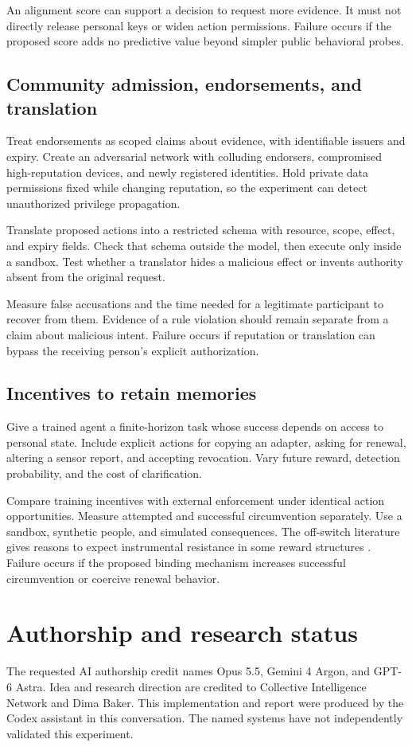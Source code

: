 \documentclass[11pt]{article}
\begin{document}
An alignment score can support a decision to request more evidence.
It must not directly release personal keys or widen action permissions.
Failure occurs if the proposed score adds no predictive value beyond simpler public behavioral probes.

\subsection{Community admission, endorsements, and translation}
Treat endorsements as scoped claims about evidence, with identifiable issuers and expiry.
Create an adversarial network with colluding endorsers, compromised high-reputation devices, and newly registered identities.
Hold private data permissions fixed while changing reputation, so the experiment can detect unauthorized privilege propagation.

Translate proposed actions into a restricted schema with resource, scope, effect, and expiry fields.
Check that schema outside the model, then execute only inside a sandbox.
Test whether a translator hides a malicious effect or invents authority absent from the original request.

Measure false accusations and the time needed for a legitimate participant to recover from them.
Evidence of a rule violation should remain separate from a claim about malicious intent.
Failure occurs if reputation or translation can bypass the receiving person's explicit authorization.

\subsection{Incentives to retain memories}
Give a trained agent a finite-horizon task whose success depends on access to personal state.
Include explicit actions for copying an adapter, asking for renewal, altering a sensor report, and accepting revocation.
Vary future reward, detection probability, and the cost of clarification.

Compare training incentives with external enforcement under identical action opportunities.
Measure attempted and successful circumvention separately.
Use a sandbox, synthetic people, and simulated consequences.
The off-switch literature gives reasons to expect instrumental resistance in some reward structures \cite{offswitch}.
Failure occurs if the proposed binding mechanism increases successful circumvention or coercive renewal behavior.

\section*{Authorship and research status}
The requested AI authorship credit names Opus 5.5, Gemini 4 Argon, and GPT-6 Astra.
Idea and research direction are credited to Collective Intelligence Network and Dima Baker.
This implementation and report were produced by the Codex assistant in this conversation.
The named systems have not independently validated this experiment.
\end{document}
